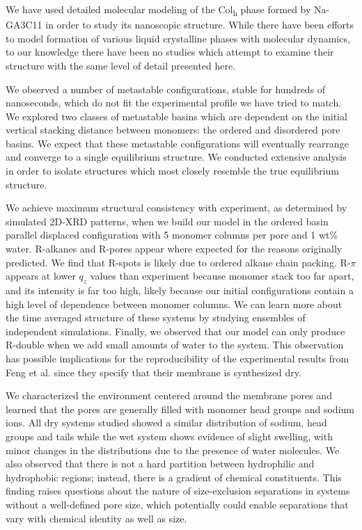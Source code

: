 \documentclass[journal=jpcbfk,manuscript=article]{achemso}
\begin{document}
  We have used detailed molecular modeling of the Col\textsubscript{h} phase
  formed by Na-GA3C11 in order to study its nanoscopic structure. While there
  have been efforts to model formation of various liquid crystalline phases with
  molecular dynamics, to our knowledge there have been no studies which attempt
  to examine their structure with the same level of detail presented here.
  
  We observed a number of metastable configurations, stable for hundreds of 
  nanoseconds, which do not fit the experimental profile we have tried to match. 
  We explored two classes of metastable basins which are dependent on the initial
  vertical stacking distance between monomers: the ordered and disordered pore basins.
  We expect that these metastable configurations will eventually rearrange and converge
  to a single equilibrium structure. We conducted extensive analysis in order to 
  isolate structures which most closely resemble the true equilibrium structure.

  We achieve maximum structural consistency with experiment, as determined by
  simulated 2D-XRD patterns, when we build our model in the ordered basin
  parallel displaced configuration with 5 monomer columns per pore and 1 wt\%
  water. R-alkanes and R-pores appear where expected for the reasons originally
  predicted. We find that R-spots is likely due to ordered alkane chain packing.
  R-$\pi$ appears at lower $q_z$ values than experiment because monomer stack too far
  apart, and its intensity is far too high, likely because our initial
  configurations contain a high level of dependence between monomer columns.
  We can learn more about the time averaged structure of these systems by studying
  ensembles of independent simulations. Finally, we observed that our model can 
  only produce R-double when we add small amounts of water to the system. This 
  observation has possible implications for the reproducibility of the experimental
  results from Feng et al. since they specify that their membrane is synthesized dry.  

  We characterized the environment centered around the membrane pores and
  learned that the pores are generally filled with monomer head groups and sodium
  ions. All dry systems studied showed a similar distribution of sodium, head
  groups and tails while the wet system shows evidence of slight swelling, with
  minor changes in the distributions due to the presence of water molecules. We
  also observed that there is not a hard partition between hydrophilic and
  hydrophobic regions; instead, there is a gradient of chemical constituents. This finding raises
  questions about the nature of size-exclusion separations in systems without a
  well-defined pore size, which potentially could enable separations that
  vary with chemical identity as well as size. 
\end{document}
